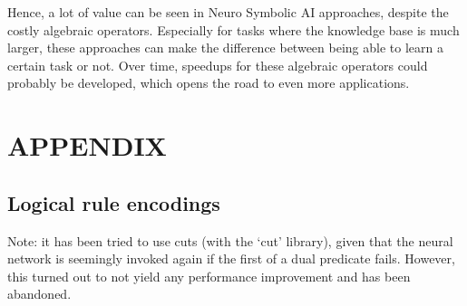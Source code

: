 \documentclass[english]{sobraep}
\begin{document}
Hence, a lot of value can be seen in Neuro Symbolic AI approaches, despite the costly algebraic operators. Especially for tasks where the knowledge base is much larger, these approaches can make the difference between being able to learn a certain task or not. Over time, speedups for these algebraic operators could probably be developed, which opens the road to even more applications.


 

\section*{APPENDIX}
\subsection{Logical rule encodings}
Note: it has been tried to use cuts (with the `cut' library), given that the neural network is seemingly invoked again if the first of a dual predicate fails. However, this turned out to not yield any performance improvement and has been abandoned.
\label{appendix:logical_rule_encodings}
\inputminted[breaklines]{prolog}{"/home/jorrit/Data/KU Leuven/Semester 12/Capita Selecta H05N0a/deepproblog/src/deepproblog/examples/SORTOFCLEVR/model.pl"}

\end{document}
